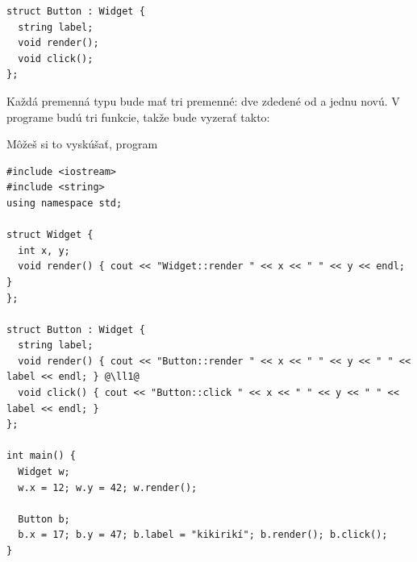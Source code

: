 \begin{lstlisting}
struct Button : Widget {
  string label;
  void render();
  void click();
};
\end{lstlisting}

Každá premenná typu  bude mať tri premenné: dve zdedené od 
a jednu novú. V programe budú tri funkcie, takže  bude vyzerať takto:


Môžeš si to vyskúšať, program

\begin{lstlisting}[label={l:ded.1}]
#include <iostream>
#include <string>
using namespace std;

struct Widget {
  int x, y;
  void render() { cout << "Widget::render " << x << " " << y << endl; }
};

struct Button : Widget {
  string label;
  void render() { cout << "Button::render " << x << " " << y << " " << label << endl; } @\ll1@
  void click() { cout << "Button::click " << x << " " << y << " " << label << endl; }
};

int main() {
  Widget w; 
  w.x = 12; w.y = 42; w.render();

  Button b;
  b.x = 17; b.y = 47; b.label = "kikirikí"; b.render(); b.click();
}
\end{lstlisting}

